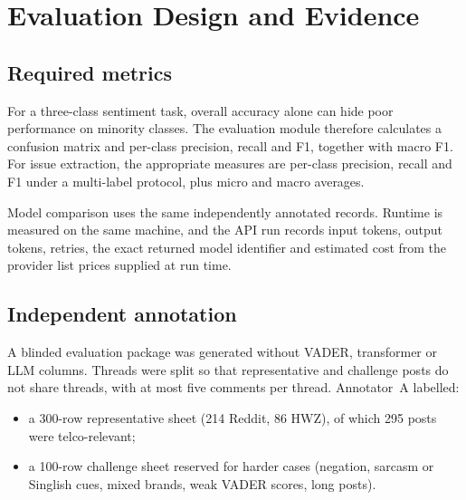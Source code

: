 \documentclass[11pt,a4paper]{article}
\begin{document}
\section{Evaluation Design and Evidence}

\subsection{Required metrics}

For a three-class sentiment task, overall accuracy alone can hide poor performance on minority classes. The evaluation module therefore calculates a confusion matrix and per-class precision, recall and F1, together with macro F1. For issue extraction, the appropriate measures are per-class precision, recall and F1 under a multi-label protocol, plus micro and macro averages.

Model comparison uses the same independently annotated records. Runtime is measured on the same machine, and the API run records input tokens, output tokens, retries, the exact returned model identifier and estimated cost from the provider list prices supplied at run time.

\subsection{Independent annotation}

A blinded evaluation package was generated without VADER, transformer or LLM columns. Threads were split so that representative and challenge posts do not share threads, with at most five comments per thread. Annotator~A labelled:

\begin{itemize}
  \item a 300-row representative sheet (214 Reddit, 86 HWZ), of which 295 posts were telco-relevant;
  \item a 100-row challenge sheet reserved for harder cases (negation, sarcasm or Singlish cues, mixed brands, weak VADER scores, long posts).
\end{itemize}
\end{document}
